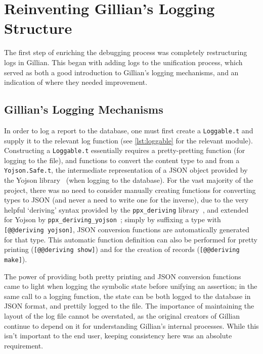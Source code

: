 
\section{Reinventing Gillian's Logging Structure}\label{sec:log-structure}

The first step of enriching the debugging process was completely restructuring
logs in Gillian. This began with adding logs to the unification process,
which served as both a good introduction to Gillian's logging mechanisms,
and an indication of where they needed improvement.


\subsection{Gillian's Logging Mechanisms}

In order to log a report to the database, one must first create a
\texttt{Loggable.t} and supply it to the relevant log function (see
\autoref{lst:loggable} for the relevant module). Constructing a
\texttt{Loggable.t} essentially requires a pretty-pretting function (for logging
to the file), and functions to convert the content type to and from a
\texttt{Yojson.Safe.t}, the intermediate representation of a JSON object
provided by the Yojson library~\cite{yojson} (when logging to the database). For
the vast majority of the project, there was no need to consider manually
creating functions for converting types to JSON (and never a need to write one
for the inverse), due to the very helpful `deriving' syntax provided by the
\texttt{ppx\_deriving} library~\cite{ppx-deriving}, and extended for Yojson by
\texttt{ppx\_deriving\_yojson}~\cite{ppx-deriving-yojson}; simply by suffixing a
type with \texttt{[@@deriving yojson]}, JSON conversion functions are
automatically generated for that type. This automatic function definition can
also be performed for pretty printing (\texttt{[@@deriving show]}) and for
the creation of records (\texttt{[@@deriving make]}).

The power of providing both pretty printing and JSON conversion functions came
to light when logging the symbolic state before unifying an assertion; in the
same call to a logging function, the state can be both logged to the database
in JSON format, and prettily logged to the file. The importance of maintaining
the layout of the log file cannot be overstated, as the original creators of
Gillian continue to depend on it for understanding Gillian's internal processes.
While this isn't important to the end user, keeping consistency here was an
absolute requirement.

